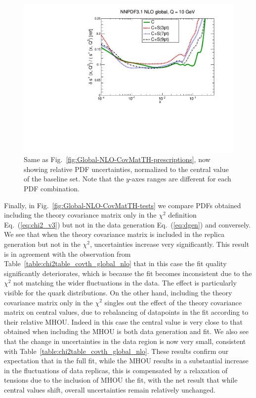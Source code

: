 \begin{figure}[t]
\begin{center}
   \includegraphics[scale=0.39]{mhous/plots/xsp-ERR-Global-NLO-CovMatTH-prescriptions-uncertainties.pdf}
   \caption{\small Same as
     Fig.~\ref{fig:Global-NLO-CovMatTH-prescriptions}, now showing
     relative PDF uncertainties, normalized to the central value of the baseline set.
     Note that the $y$-axes ranges are different
     for each PDF combination.
    \label{fig:Global-NLO-CovMatTH-prescriptions-uncertainties} }
  \end{center}
\end{figure}



Finally, in Fig.~\ref{fig:Global-NLO-CovMatTH-tests} we compare PDFs
obtained including the theory covariance matrix
only in the $\chi^2$ definition Eq.~(\ref{eq:chi2_v3}) but not
in the data generation Eq.~(\ref{eq:dgen}) and conversely.
%
We see that when the theory covariance matrix is included in the
replica generation but not in the $\chi^2$, uncertainties increase
very significantly.
%
This result is in agreement with the observation from
Table~\ref{table:chi2table_covth_global_nlo} that in this case the
fit quality significantly deteriorates, which is because the fit
becomes inconsistent due to the $\chi^2$ not matching the
wider fluctuations in the data.
%
The effect is particularly visible for the
quark distributions.
%
On the other hand, including the theory
covariance matrix only in the $\chi^2$  singles out the effect of
the theory covariance matrix on central values, due to rebalancing of 
datapoints in the fit according to their relative MHOU.
%
Indeed in this case
the central value is very close to that obtained when including the MHOU 
is both data generation and fit. We also see that the change in
uncertainties in the data region is now very small, consistent with
Table~\ref{table:chi2table_covth_global_nlo}.
%
These results confirm our 
expectation that in the full fit, while the MHOU results in a substantial 
increase in the fluctuations of data replicas, this is compensated by 
a relaxation of tensions due to the inclusion of MHOU the fit, with 
the net result that while central values shift, overall uncertainties 
remain relatively unchanged.

